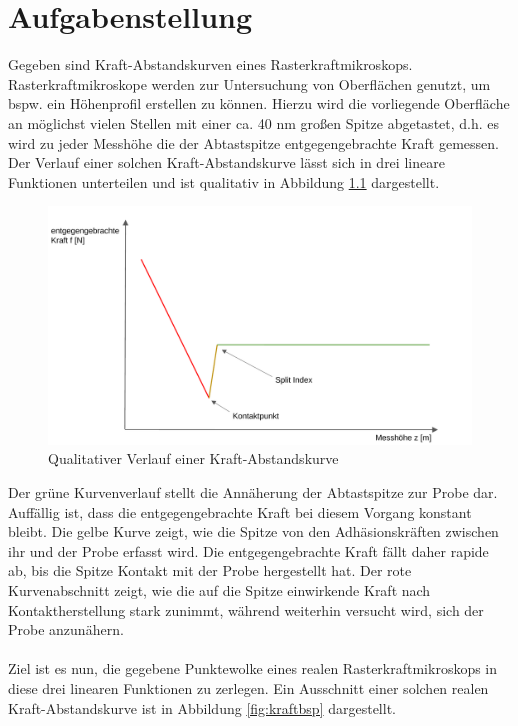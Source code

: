 \chapter{Aufgabenstellung}
Gegeben sind Kraft-Abstandskurven eines Rasterkraftmikroskops. Rasterkraftmikroskope werden zur Untersuchung von Oberflächen genutzt, um bspw. ein Höhenprofil erstellen zu können. Hierzu wird die vorliegende Oberfläche an möglichst vielen Stellen mit einer ca. 40 nm großen Spitze abgetastet, d.h. es wird zu jeder Messhöhe die der Abtastspitze entgegengebrachte Kraft gemessen.
Der Verlauf einer solchen Kraft-Abstandskurve lässt sich in drei lineare Funktionen unterteilen und ist qualitativ in Abbildung \ref{fig:kraftqual} dargestellt.

\begin{figure}[h!]
\centering
\includegraphics[scale=0.5]{qual.pdf}
\caption{Qualitativer Verlauf einer Kraft-Abstandskurve}
\label{fig:kraftqual}
\end{figure}

Der grüne Kurvenverlauf stellt die Annäherung der Abtastspitze zur Probe dar. Auffällig ist, dass die entgegengebrachte Kraft bei diesem Vorgang konstant bleibt.
Die gelbe Kurve zeigt, wie die Spitze von den Adhäsionskräften zwischen ihr und der Probe erfasst wird. Die entgegengebrachte Kraft fällt daher rapide ab, bis die Spitze Kontakt mit der Probe hergestellt hat.
Der rote Kurvenabschnitt zeigt, wie die auf die Spitze einwirkende Kraft nach Kontaktherstellung stark zunimmt, während weiterhin versucht wird, sich der Probe anzunähern.
\\\\
Ziel ist es nun, die gegebene Punktewolke eines realen Rasterkraftmikroskops in diese drei linearen Funktionen zu zerlegen.
Ein Ausschnitt einer solchen realen Kraft-Abstandskurve ist in Abbildung \ref{fig:kraftbsp} dargestellt.


